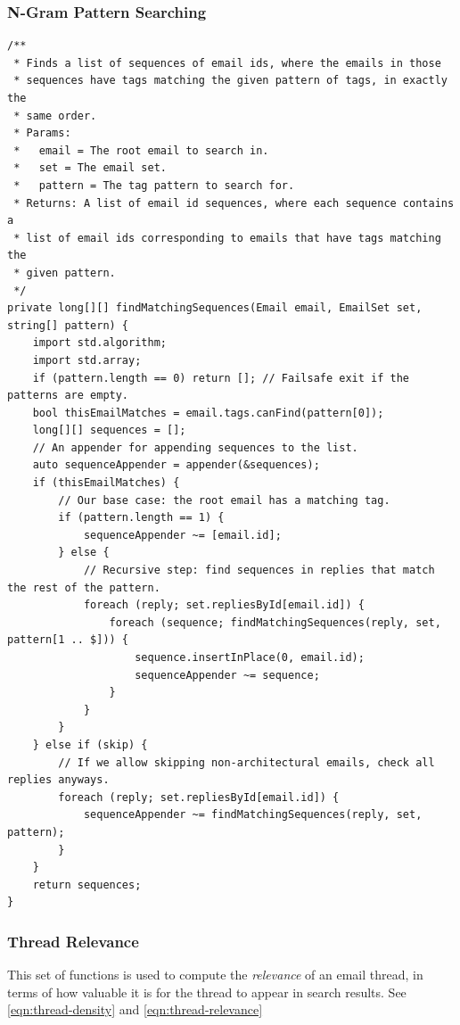 \documentclass[a4paper, 12pt]{article}
\begin{document}
		\subsubsection{N-Gram Pattern Searching}
			\label{sec:pattern-algorithm}
			\begin{verbatim}
/**
 * Finds a list of sequences of email ids, where the emails in those
 * sequences have tags matching the given pattern of tags, in exactly the
 * same order.
 * Params:
 *   email = The root email to search in.
 *   set = The email set.
 *   pattern = The tag pattern to search for.
 * Returns: A list of email id sequences, where each sequence contains a
 * list of email ids corresponding to emails that have tags matching the
 * given pattern.
 */
private long[][] findMatchingSequences(Email email, EmailSet set, string[] pattern) {
	import std.algorithm;
	import std.array;
	if (pattern.length == 0) return []; // Failsafe exit if the patterns are empty.
	bool thisEmailMatches = email.tags.canFind(pattern[0]);
	long[][] sequences = [];
	// An appender for appending sequences to the list.
	auto sequenceAppender = appender(&sequences);
	if (thisEmailMatches) {
		// Our base case: the root email has a matching tag.
		if (pattern.length == 1) {
			sequenceAppender ~= [email.id];
		} else {
			// Recursive step: find sequences in replies that match the rest of the pattern.
			foreach (reply; set.repliesById[email.id]) {
				foreach (sequence; findMatchingSequences(reply, set, pattern[1 .. $])) {
					sequence.insertInPlace(0, email.id);
					sequenceAppender ~= sequence;
				}
			}
		}
	} else if (skip) {
		// If we allow skipping non-architectural emails, check all replies anyways.
		foreach (reply; set.repliesById[email.id]) {
			sequenceAppender ~= findMatchingSequences(reply, set, pattern);
		}
	}
	return sequences;
}
			\end{verbatim}
		
		\newpage
		\subsubsection{Thread Relevance}
			\label{sec:thread-relevance-algorithm}
			This set of functions is used to compute the \textit{relevance} of an email thread, in terms of how valuable it is for the thread to appear in search results. See \eqref{eqn:thread-density} and \eqref{eqn:thread-relevance}
			
\end{document}
